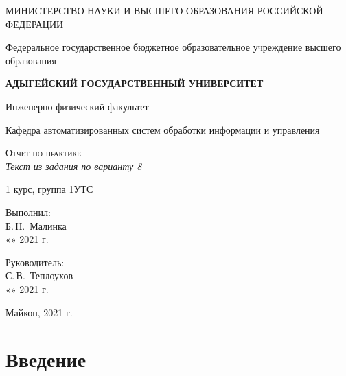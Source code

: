 \documentclass[12pt,a4paper]{scrartcl}
\begin{document}
	\begin{titlepage}
		\begin{center}
			\large
			МИНИСТЕРСТВО НАУКИ И ВЫСШЕГО ОБРАЗОВАНИЯ РОССИЙСКОЙ ФЕДЕРАЦИИ
			
			Федеральное государственное бюджетное образовательное учреждение высшего образования
			
			\textbf{АДЫГЕЙСКИЙ ГОСУДАРСТВЕННЫЙ УНИВЕРСИТЕТ}
			\vspace{0.25cm}
			
			Инженерно-физический факультет
			
			Кафедра автоматизированных систем обработки информации и управления
			\vfill

			\vfill
			
			\textsc{Отчет по практике}\\[5mm]
			
			{\LARGE \textit{Текст из задания по варианту 8}}
			\bigskip
			
			1 курс, группа 1УТС
		\end{center}
		\vfill
		
		\newlength{\ML}
		\hfill\begin{minipage}{0.5\textwidth}
			Выполнил:\\
			\underline{\hspace{\ML}} Б.\,Н.~Малинка\\
			«\underline{\hspace{0.7cm}}» \underline{\hspace{2cm}} 2021 г.
		\end{minipage}%
		\bigskip
		
		\hfill\begin{minipage}{0.5\textwidth}
			Руководитель:\\
			\underline{\hspace{\ML}} С.\,В.~Теплоухов\\
			«\underline{\hspace{0.7cm}}» \underline{\hspace{2cm}} 2021 г.
		\end{minipage}%
		\vfill
		
		\begin{center}
			Майкоп, 2021 г.
		\end{center}
	\end{titlepage}

\section{Введение}
\label{sec:intro}
\end{document}
